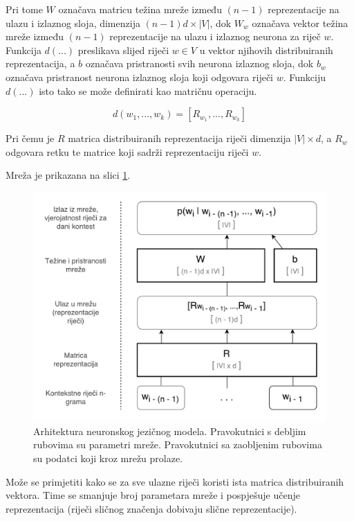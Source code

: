 \documentclass[times, utf8, diplomski, numeric]{fer}
\begin{document}
Pri tome $W$ označava matricu težina  mreže između $(n - 1)$ reprezentacije na ulazu i izlaznog sloja, dimenzija $(n - 1) d \times |V|$, dok $W_w$ označava vektor težina mreže između $(n - 1)$ reprezentacije na ulazu i izlaznog neurona za riječ $w$. Funkcija $d(...)$ preslikava slijed riječi $w \in V$ u vektor njihovih distribuiranih reprezentacija, a $b$ označava pristranosti  svih neurona izlaznog sloja, dok $b_w$ označava pristranost neurona izlaznog sloja koji odgovara riječi $w$. Funkciju $d(...)$ isto tako se može definirati kao matričnu operaciju.

\begin{equation}
\label{eq:d_func}
d(w_1, ..., w_k) = \left[R_{w_1}, ..., R_{w_k}\right]
\end{equation}

Pri čemu je $R$ matrica distribuiranih reprezentacija  riječi dimenzija $|V| \times d$, a $R_w$ odgovara retku te matrice koji sadrži reprezentaciju riječi $w$.

Mreža je prikazana na slici \ref{fig:nnet}.

\begin{figure}[!htb]
\centering
\includegraphics{fig/nnet.pdf}
\caption{Arhitektura neuronskog jezičnog modela. Pravokutnici s debljim rubovima su parametri mreže. Pravokutnici sa zaobljenim rubovima su podatci koji kroz mrežu prolaze.}
\label{fig:nnet}
\end{figure}

Može se primjetiti kako se za sve ulazne riječi koristi ista matrica distribuiranih vektora. Time se smanjuje broj parametara mreže i pospješuje učenje reprezentacija (riječi sličnog značenja dobivaju slične reprezentacije).
\end{document}
